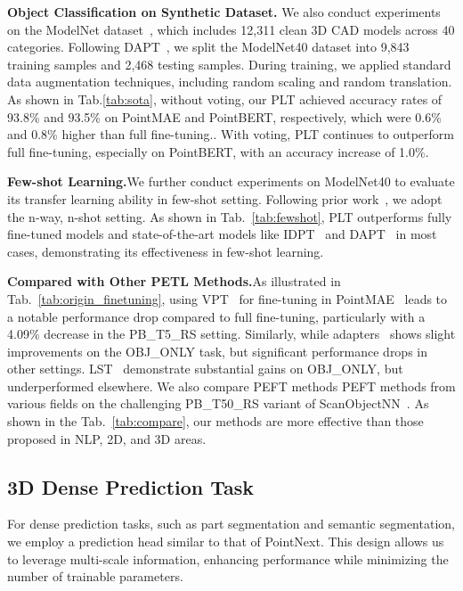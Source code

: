 \textbf{Object Classification on Synthetic Dataset.} We also conduct experiments on the ModelNet dataset~\cite{wu20153d}, which includes 12,311 clean 3D CAD models across 40 categories. Following DAPT~\cite{zhou2024dynamic}, we split the ModelNet40 dataset into 9,843 training samples and 2,468 testing samples. During training, we applied standard data augmentation techniques, including random scaling and random translation. As shown in Tab.\ref{tab:sota}, without voting, our PLT achieved accuracy rates of 93.8\% and 93.5\% on PointMAE and PointBERT, respectively, which were 0.6\% and 0.8\% higher than full fine-tuning.. With voting, PLT continues to outperform full fine-tuning, especially on PointBERT, with an accuracy increase of 1.0\%.

\textbf{Few-shot Learning.}We further conduct experiments on ModelNet40 to evaluate its transfer learning ability in few-shot setting. Following prior work~\cite{pang2022masked,zha2023instance,zhou2024dynamic}, we adopt the n-way, n-shot setting. As shown in Tab.~\ref{tab:fewshot}, PLT outperforms fully fine-tuned models and state-of-the-art models like IDPT~\cite{zha2023instance} and DAPT~\cite{zhou2024dynamic} in most cases, demonstrating its effectiveness in few-shot learning.

\textbf{Compared with Other PETL Methods.}As illustrated in Tab.~\ref{tab:origin_finetuning}, using VPT~\cite{jia2022visual} for fine-tuning in PointMAE~\cite{pang2022masked} leads to a notable performance drop compared to full fine-tuning, particularly with a 4.09\% decrease in the PB\_T5\_RS setting. Similarly, while adapters~\cite{houlsby2019parameter} shows slight improvements on the OBJ\_ONLY task, but significant performance drops in other settings. LST~\cite{sung2022lst} demonstrate substantial gains on OBJ\_ONLY, but underperformed elsewhere. We also compare PEFT methods PEFT methods from various fields on the challenging PB\_T50\_RS variant of ScanObjectNN~\cite{uy2019revisiting}. As shown in the Tab.~\ref{tab:compare}, our methods are more effective than those proposed in NLP, 2D, and 3D areas. 











\subsection{3D Dense Prediction Task}
For dense prediction tasks, such as part segmentation and semantic segmentation, we employ a prediction head similar to that of PointNext. This design allows us to leverage multi-scale information, enhancing performance while minimizing the number of trainable parameters.


